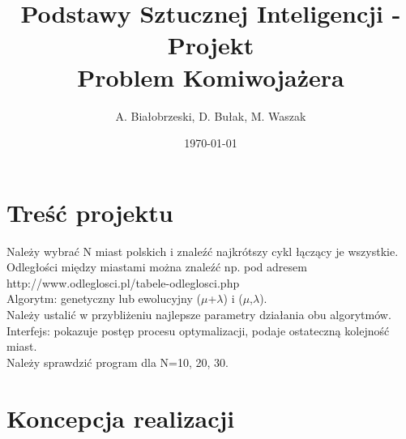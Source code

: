\documentclass[11pt]{article}
\title{Podstawy Sztucznej Inteligencji - Projekt \\ \large Problem Komiwojażera}
\author{A. Białobrzeski, D. Bułak, M. Waszak}
\date{\today}
\begin{document}
\maketitle

\section{Treść projektu}
Należy wybrać N miast polskich i znaleźć najkrótszy cykl łączący je wszystkie.\\
Odległości między miastami można znaleźć np. pod adresem
http://www.odleglosci.pl/tabele-odleglosci.php\\
Algorytm: genetyczny lub ewolucyjny ($\mu$+$\lambda$) i ($\mu$,$\lambda$).\\Należy ustalić w przybliżeniu najlepsze parametry działania obu algorytmów.\\
Interfejs: pokazuje postęp procesu optymalizacji, podaje ostateczną kolejność miast.\\
Należy sprawdzić program dla N=10, 20, 30. 


\section{Koncepcja realizacji}
\end{document}
